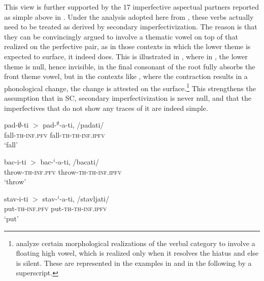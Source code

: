 \documentclass[output=paper]{langscibook}
\begin{document}
This view is further supported by the 17 imperfective aspectual partners reported as simple above in . Under the analysis adopted here from \citet{SimMilAr2021}, these verbs actually need to be treated as derived by secondary imperfectivization. The reason is that they can be convincingly argued to involve a thematic vowel on top of that realized on the perfective pair, as in those contexts in which the lower theme is expected to surface, it indeed does. This is illustrated in %
, where in , the lower theme is null, hence invisible, in  the final consonant of the root fully absorbs the front theme vowel, but in the contexts like , where the contraction results in a phonological change, the change is attested on the surface.\footnote{\citet{SimMilAr2021} analyze certain morphological realizations of the verbal category to involve a floating high vowel, which is realized only when it resolves the hiatus and else is silent. These are represented in the examples in  and in the following by a superscript.} This strengthens the assumption that in SC, secondary imperfectivization is never null, and that the imperfectives that do not show any traces of it are indeed simple.

\ea\label{ars:ex:simplenot}
	\begin{xlist} 
		
	    \ex  \gll pad-$\emptyset$-ti $>$ {pad-$^\emptyset$-a-ti, /padati/}\\ 
                  fall-\textsc{th-inf.pfv} {} fall-\textsc{th-th-inf.ipfv}\\ 
            \glt `fall' \label{ars:ex:simplenota}
            
	    \ex  \gll bac-i-ti $>$ {bac-$^i$-a-ti, /bacati/}\\ 
                  throw-\textsc{th-inf.pfv} {} throw-\textsc{th-th-inf.ipfv}\\ 
            \glt `throw' \label{ars:ex:simplenotb}
            
	    \ex  \gll stav-i-ti $>$ {stav-$^i$-a-ti, /stavljati/}\\ 
                  put-\textsc{th-inf.pfv} {} put-\textsc{th-th-inf.ipfv}\\ 
            \glt `put' \label{ars:ex:simplenotc}

	\end{xlist}
\z
\end{document}
